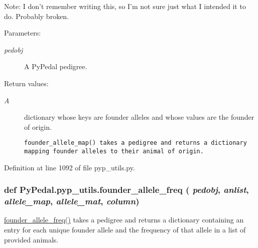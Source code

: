 \begin{Desc}
\item[Note:]I don't remember writing this, so I'm not sure just what I intended it to do. Probably broken. \end{Desc}
\begin{Desc}
\item[Parameters:]
\begin{description}
\item[{\em pedobj}]A Py\-Pedal pedigree. \end{description}
\end{Desc}
\begin{Desc}
\item[Return values:]
\begin{description}
\item[{\em A}]dictionary whose keys are founder alleles and whose values are the founder of origin.

\footnotesize\begin{verbatim}founder_allele_map() takes a pedigree and returns a dictionary
mapping founder alleles to their animal of origin.
\end{verbatim}
\normalsize
 \end{description}
\end{Desc}


Definition at line 1092 of file pyp\_\-utils.py.\hypertarget{namespacePyPedal_1_1pyp__utils_a3b4f214f889ea58a62840950ae0e957}{
\subsubsection[founder\_\-allele\_\-freq]{\setlength{\rightskip}{0pt plus 5cm}def Py\-Pedal.pyp\_\-utils.founder\_\-allele\_\-freq ( {\em pedobj},  {\em anlist},  {\em allele\_\-map},  {\em allele\_\-mat},  {\em column})}}
\label{namespacePyPedal_1_1pyp__utils_a3b4f214f889ea58a62840950ae0e957}


\hyperlink{namespacePyPedal_1_1pyp__utils_a3b4f214f889ea58a62840950ae0e957}{founder\_\-allele\_\-freq()} takes a pedigree and returns a dictionary containing an entry for each unique founder allele and the frequency of that allele in a list of provided animals. 

